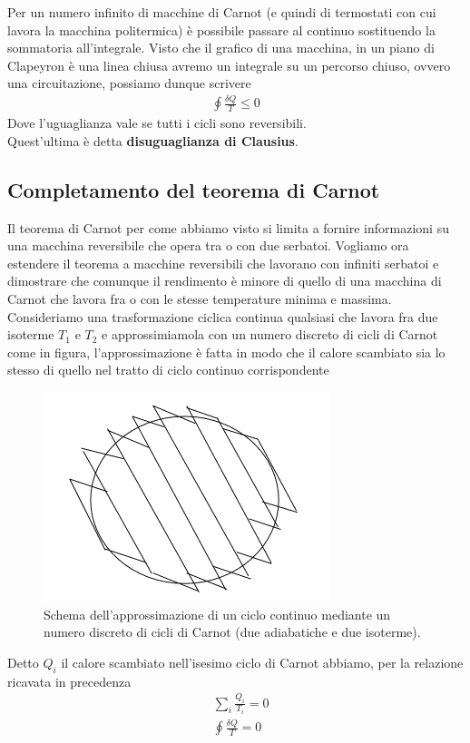 \documentclass[10pt,a4paper]{article}
\begin{document}
Per un numero infinito di macchine di Carnot (e quindi di termostati con cui lavora la macchina politermica) è possibile passare al continuo sostituendo la sommatoria all'integrale. Visto che il grafico di una macchina, in un piano di Clapeyron è una linea chiusa avremo un integrale su un percorso chiuso, ovvero una circuitazione, possiamo dunque scrivere
\begin{align*}
	\oint \frac{\delta Q}{T}\leq 0
\end{align*}
Dove l'uguaglianza vale se tutti i cicli sono reversibili.\\
Quest'ultima è detta \textbf{disuguaglianza di Clausius}.
\subsection{Completamento del teorema di Carnot}
Il teorema di Carnot per come abbiamo visto si limita a fornire informazioni su una macchina reversibile che opera tra o con due serbatoi. Vogliamo ora estendere il teorema a macchine reversibili che lavorano con infiniti serbatoi e dimostrare che comunque il rendimento è minore di quello di una macchina di Carnot che lavora fra o con le stesse temperature minima e massima.\\
Consideriamo una trasformazione ciclica continua qualsiasi che lavora fra due isoterme \(T_1\) e \(T_2\) e approssimiamola con un numero discreto di cicli di Carnot come in figura, l'approssimazione è fatta in modo che il calore scambiato sia lo stesso di quello nel tratto di ciclo continuo corrispondente
\begin{figure}[h!]
	\centering
	\includegraphics[width=0.5\linewidth]{../images/ciclo_continuo}
	\caption{Schema dell'approssimazione di un ciclo continuo mediante un numero discreto di cicli di Carnot (due adiabatiche e due isoterme).}
	\label{fig:ciclocontinuo}
\end{figure}
\FloatBarrier
Detto \(Q_i\) il calore scambiato nell'isesimo ciclo di Carnot abbiamo, per la relazione ricavata in precedenza
\begin{align*}
	&\sum_i \frac{Q_i}{T_i} = 0\\
	&\oint \frac{\delta Q}{T} = 0
\end{align*}
\end{document}
